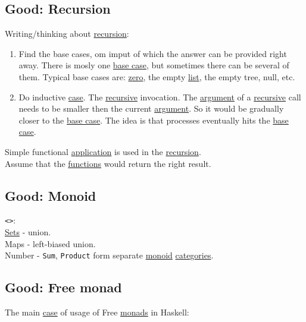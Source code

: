 \documentclass[11pt]{article}
\begin{document}
\subsection{\label{orgf56b024}Good: Recursion}
\label{sec:org1843196}
Writing/thinking about \hyperref[orgc27dbaf]{recursion}:\\

\begin{enumerate}
\item Find the base cases, om imput of which the answer can be provided right away. There is mosly one \hyperref[org0e15f55]{base case}, but sometimes there can be several of them. Typical base cases are: \hyperref[orgf8da8e8]{zero}, the empty \hyperref[org8ae0f28]{list}, the empty tree, null, etc.\\
\item Do inductive \hyperref[org96bceb0]{case}. The \hyperref[org06bac4d]{recursive} invocation. The \hyperref[orgf66a5f7]{argument} of a \hyperref[org06bac4d]{recursive} call needs to be smaller then the current \hyperref[orgf66a5f7]{argument}. So it would be gradually closer to the \hyperref[org0e15f55]{base case}. The idea is that processes eventually hits the \hyperref[org0e15f55]{base case}.\\
\end{enumerate}

Simple functional \hyperref[orged2f814]{application} is used in the \hyperref[orgc27dbaf]{recursion}.\\
Assume that the \hyperref[org66c5288]{functions} would return the right result.\\


\subsection{\label{orgca130b2}Good: Monoid}
\label{sec:orgeed08ab}
\texttt{<>}:\\
\hyperref[org4e7443a]{Sets} - union.\\
Maps - left-biased union.\\
Number - \texttt{Sum}, \texttt{Product} form separate \hyperref[org8ff50ea]{monoid} \hyperref[org43ea200]{categories}.\\

\subsection{\label{org9db8efe}Good: Free monad}
\label{sec:org2deb845}
The main \hyperref[org96bceb0]{case} of usage of Free \hyperref[org3ecde32]{monads} in Haskell:\\
\end{document}
